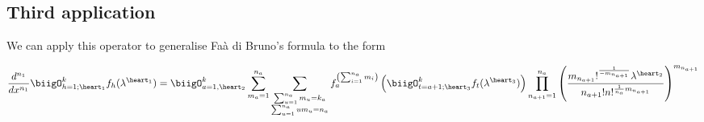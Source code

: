 \subsection{Third application}

We can apply this operator to generalise Faà di 
Bruno's formula to the form

\begin{align}
      \frac{d^{n_1}}{dx^{n_1}}\biigO_{h=1; \heart_1}^k 
      f_h(\lambda^{\heart_1}) = \biigO_{a=1, \heart_2}^k
      \sum_{m_a=1}^{n_a}\sum_{\substack{\sum_{u=1}^{n_a}m_u
      =k_a \\ \sum_{u=1}^{n_a}um_u=n_a}} f_a^{\left(\sum_{
      i=1}^{n_a} m_i\right)}\left(\biigO_{t=a+1; \heart_3 
      }^k f_t(\lambda^{\heart_3 })\right)\prod_{n_{a+1}=1
      }^{n_a}\left(\frac{m_{n_{a+1}}!^{\frac{1}{-m_{n_{a+
      1}}}}\lambda^{\heart_2}}{n_{a+1}!n!^{\frac{1}{n_a}
      m_{n_{a+1}}}}\right)^{m_{n_{a+1}}}
\end{align}
